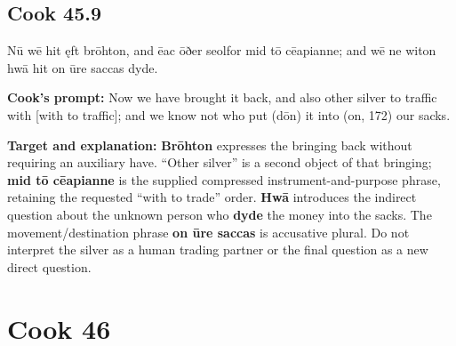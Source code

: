 \par\begin{minipage}{\linewidth}\raggedright
\subsection*{Cook 45.9}

Nū wē hit ęft brōhton, and ēac ōðer seolfor mid tō cēapianne; and wē ne witon hwā hit on ūre saccas dyde.

\textbf{Cook’s prompt:} Now we have brought it back, and also other silver to traffic with [with to traffic]; and we know not who put (dōn) it into (on, 172) our sacks.

\textbf{Target and explanation:} \textbf{Brōhton} expresses the bringing back without requiring an auxiliary have. “Other silver” is a second object of that bringing; \textbf{mid tō cēapianne} is the supplied compressed instrument-and-purpose phrase, retaining the requested “with to trade” order. \textbf{Hwā} introduces the indirect question about the unknown person who \textbf{dyde} the money into the sacks. The movement/\allowbreak{}destination phrase \textbf{on ūre saccas} is accusative plural. Do not interpret the silver as a human trading partner or the final question as a new direct question.

\end{minipage}\par\addvspace{4pt}

\clearpage
\section*{Cook 46}

